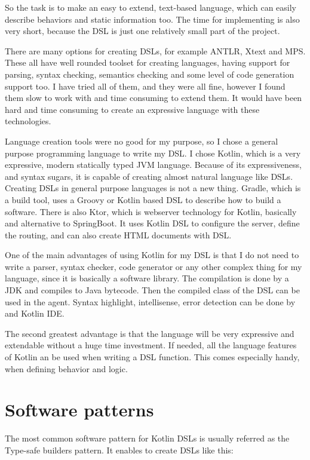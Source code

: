 So the task is to make an easy to extend, text-based language, which can easily describe behaviors and static information too. The time for implementing is also very short, because the DSL is just one relatively small part of the project. 

There are many options for creating DSLs, for example ANTLR, Xtext and MPS. These all have well rounded toolset for creating languages, having support for parsing, syntax checking, semantics checking and some level of code generation support too. I have tried all of them, and they were all fine, however I found them slow to work with and time consuming to extend them. It would have been hard and time consuming to create an expressive language with these technologies.

Language creation tools were no good for my purpose, so I chose a general purpose programming language to write my DSL. I chose Kotlin, which is a very expressive, modern statically typed JVM language. Because of its expressiveness, and syntax sugars, it is capable of creating almost natural language like DSLs. Creating DSLs in general purpose languages is not a new thing. Gradle, which is a build tool, uses a Groovy or Kotlin based DSL to describe how to build a software. There is also Ktor, which is webserver technology for Kotlin, basically and alternative to SpringBoot. It uses Kotlin DSL to configure the server, define the routing, and can also create HTML documents with DSL.

One of the main advantages of using Kotlin for my DSL is that I do not need to write a parser, syntax checker, code generator or any other complex thing for my language, since it is basically a software library. The compilation is done by a JDK and compiles to Java bytecode. Then the compiled class of the DSL can be used in the agent. Syntax highlight, intellisense, error detection can be done by and Kotlin IDE.

The second greatest advantage is that the language will be very expressive and extendable without a huge time investment. If needed, all the language features of Kotlin an be used when writing a DSL function. This comes especially handy, when defining behavior and logic.

\section{Software patterns}

The most common software pattern for Kotlin DSLs is usually referred as the Type-safe builders pattern. It enables to create DSLs like this:

